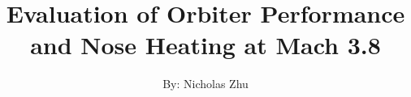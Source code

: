 \documentclass{article}
\title{Evaluation of Orbiter Performance and Nose Heating at Mach 3.8}
\begin{document}
\author{By: Nicholas Zhu}
\maketitle











\end{document}
